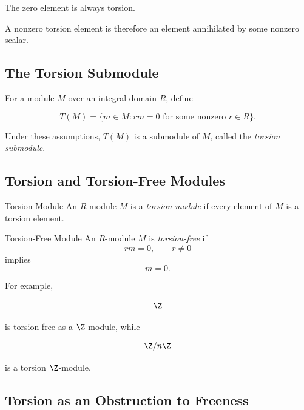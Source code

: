 The zero element is always torsion.

A nonzero torsion element is therefore an element annihilated by some nonzero
scalar.

\subsection{The Torsion Submodule}
\label{subsec:torsion-submodule}

For a module \(M\) over an integral domain \(R\), define

\[ T(M)=\{m\in M:rm=0\text{ for some nonzero }r\in R\}. \]

Under these assumptions, \(T(M)\) is a submodule of \(M\), called the
\emph{torsion submodule}.

\subsection{Torsion and Torsion-Free Modules}
\label{subsec:torsion-free-modules}

\begin{definitionbox}{Torsion Module}
An \(R\)-module \(M\) is a \emph{torsion module} if every element of \(M\) is
a torsion element.
\end{definitionbox}

\begin{definitionbox}{Torsion-Free Module}
An \(R\)-module \(M\) is \emph{torsion-free} if
\[ rm=0,\qquad r\neq0 \]
implies
\[ m=0. \]
\end{definitionbox}

For example,

\[ \Z \]

is torsion-free as a \(\Z\)-module, while

\[ \Z/n\Z \]

is a torsion \(\Z\)-module.

\subsection{Torsion as an Obstruction to Freeness}
\label{subsec:torsion-obstruction-free}

